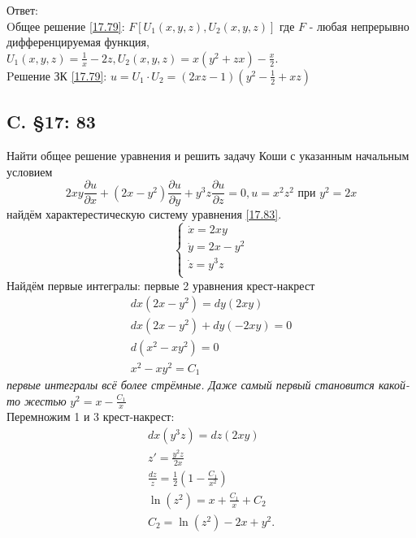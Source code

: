 \documentclass{article}
\begin{document}
Ответ:\\
 Oбщее решение \ref{17.79}: $F[U_1(x,y,z),U_2(x,y,z)]$ где $F$ - любая непрерывно дифференцируемая функция, $U_1(x,y,z)=\frac{1}{x} - 2z, U_2(x,y,z)= x(y^2+zx)-\frac{x}{2}$.\\
 Pешение ЗК \ref{17.79}: $u=U_1 \cdot U_2 = (2 x z-1)\left(y^{2}-\frac{1}{2}+x z\right)$
\subsection{C. \S17: 83}
Найти общее решение уравнения и решить задачу Коши с указанным
начальным условием
\begin{equation}\label{17.83}
2 x y \frac{\partial u}{\partial x}+\left(2 x-y^{2}\right) \frac{\partial u}{\partial y}+y^{3} z \frac{\partial u}{\partial z}=0, u=x^{2} z^{2} \text { при } y^{2}=2 x
\end{equation}
найдём характерестическую систему уравнения \ref{17.83}.
\begin{equation*}
    \begin{cases}
        \dot x = 2xy \\
        \dot y = 2 x-y^{2}\\
        \dot z = y^{3} z \\
    \end{cases}
\end{equation*}
Найдём первые интегралы: первые 2 уравнения крест-накрест
\begin{gather*}
    dx(2x-y^2)=dy(2xy)\\
    dx(2x-y^2)+dy(-2xy)=0\\
    d(x^2-xy^2)=0\\
    x^2-xy^2=C_1
\end{gather*}
 \textcolor[rgb]{0.480469,0.566406,0.480469}{\textit{первые интегралы всё более стрёмные. Даже самый первый становится какой-то жестью}} 
$y^2=x- \frac{C_1}{x}$\\
Перемножим 1 и 3 крест-накрест:
\begin{gather*}
    dx(y^3z)=dz(2xy)\\
    z'=\frac{y^2z}{2x}\\
    \frac{dz}{z}=\frac{1}{2}(1- \frac{C_1}{x^2})\\
    \ln (z^2) = x + \frac{C_1}{x} + C_2\\
    C_2 = \ln (z^2) - 2x + y^2. 
\end{gather*}
\end{document}
